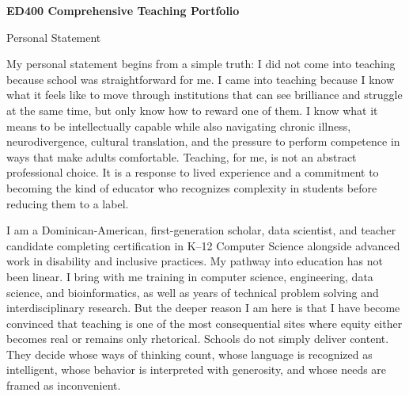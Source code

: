 \documentclass[12pt]{article}
\begin{document}
\begin{titlepage}
\begin{center}
\vspace*{0.18\textheight}
{\Large\bfseries ED400 Comprehensive Teaching Portfolio\par}
\vspace{1.5em}
{\large Personal Statement\par}
\vspace{2em}
{\PortfolioAuthor\par}
{\PortfolioAffiliation\par}
{\PortfolioProgram\par}
\vspace{2em}
{\PortfolioDate\par}
\end{center}
\end{titlepage}


My personal statement begins from a simple truth: I did not come into teaching because school was straightforward for me. I came into teaching because I know what it feels like to move through institutions that can see brilliance and struggle at the same time, but only know how to reward one of them. I know what it means to be intellectually capable while also navigating chronic illness, neurodivergence, cultural translation, and the pressure to perform competence in ways that make adults comfortable. Teaching, for me, is not an abstract professional choice. It is a response to lived experience and a commitment to becoming the kind of educator who recognizes complexity in students before reducing them to a label.

I am a Dominican-American, first-generation scholar, data scientist, and teacher candidate completing certification in K--12 Computer Science alongside advanced work in disability and inclusive practices. My pathway into education has not been linear. I bring with me training in computer science, engineering, data science, and bioinformatics, as well as years of technical problem solving and interdisciplinary research. But the deeper reason I am here is that I have become convinced that teaching is one of the most consequential sites where equity either becomes real or remains only rhetorical. Schools do not simply deliver content. They decide whose ways of thinking count, whose language is recognized as intelligent, whose behavior is interpreted with generosity, and whose needs are framed as inconvenient.
\end{document}
